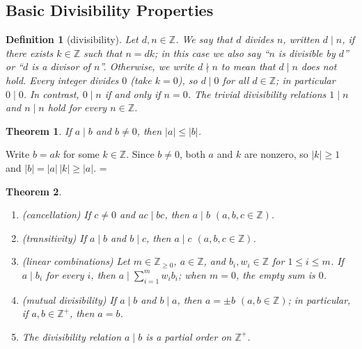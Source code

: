 \documentclass[11pt]{article}
\makeatletter
\let\nt@closedisplay\]
\def\nt@guardedclose{\@ifnextchar\par{\nt@closeafterpar}{\@ifnextchar\end{\postdisplaypenalty\@M\nt@closedisplay}{\nt@closedisplay}}}
\def\nt@closeafterpar\par{\@ifnextchar\par{\nt@closeafterpar}{\@ifnextchar\end{\postdisplaypenalty\@M\nt@closedisplay\par}{\nt@closedisplay\par}}}
\renewenvironment{proof}[1][\proofname]{\par
  \pushQED{\qed}\normalfont\topsep\medskipamount\edef\nt@afterproof{\@endparpenalty=\the\@endparpenalty\relax}\@beginparpenalty\@M\@endparpenalty\@M\let\]\nt@guardedclose\trivlist\item[]\textit{#1\@addpunct{.}} \ignorespaces}{\ifvmode\addpenalty\@M\fi\popQED\nt@afterproof\endtrivlist\@endpefalse}
\theoremstyle{ntstyle}
\newtheorem{theorem}{Theorem}[subsection]
\newtheorem{definition}{Definition}[subsection]
\newcommand{\statementlist}{\mbox{}}
\makeatother
\begin{document}
\subsection{Basic Divisibility Properties}

\begin{definition}[divisibility]\label{def:1.1.1}\label{def:divisibility}
  Let $d, n \in \mathbb{Z}$. We say that $d$ divides $n$, written $d \mid n$, if there
  exists $k \in \mathbb{Z}$ such that $n = dk$; in this case we also
  say ``$n$ is divisible by $d$'' or ``$d$ is a
  divisor of $n$''. Otherwise, we write $d \nmid n$ to mean that $d \mid n$ does not hold. Every integer divides
  $0$ (take $k = 0$), so $d \mid 0$ for all $d \in \mathbb{Z}$; in particular $0 \mid 0$. In contrast, $0 \mid n$
  if and only if $n = 0$. The trivial
  divisibility relations $1 \mid n$ and $n \mid n$ hold for every $n \in \mathbb{Z}$.

\end{definition}

\begin{theorem}\label{thm:1.1.1}\label{thm:divisibility-bound} If $a \mid b$ and $b \neq 0$, then $|a| \le |b|$.

\end{theorem}

\begin{proof} Write $b = ak$ for some $k\in\mathbb{Z}$. Since $b \neq 0$, both $a$ and $k$
  are nonzero, so $|k| \ge 1$ and $|b| = |a|\,|k| \ge |a|$.
\end{proof}

\begin{theorem}\label{thm:1.1.2}\label{thm:divisibility-properties}\statementlist

  \begin{enumerate}[label={\alph*)}]
    \item (cancellation) If $c \neq 0$ and $ac \mid bc$, then $a \mid b$ $(a, b, c \in \mathbb{Z})$.
    \item (transitivity) If $a \mid b$ and $b \mid c$, then $a \mid c$
          $(a, b, c \in \mathbb{Z})$.
    \item (linear combinations) Let $m\in\mathbb{Z}_{\ge0}$,
          $a\in\mathbb{Z}$, and $b_i,w_i\in\mathbb{Z}$ for $1\le i\le m$.
          If $a\mid b_i$ for every $i$, then
          $a\mid\sum_{i=1}^{m}w_i b_i$; when $m=0$, the empty sum is $0$.
    \item (mutual divisibility) If $a \mid b$ and $b \mid a$, then $a = \pm b$ $(a, b \in \mathbb{Z})$; in
    particular, if $a, b \in \mathbb{Z}^+$, then $a = b$.
    \item The divisibility relation $a \mid b$ is a partial order on $\mathbb{Z}^+$.
  \end{enumerate}

\end{theorem}
\end{document}
